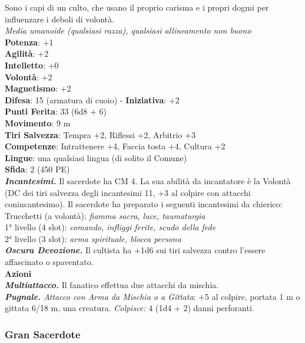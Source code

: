 \begin{multicols}{2}
Sono i capi di un culto, che usano il proprio carisma e i propri dogmi per influenzare i deboli di volontà.\\
\emph{Media umanoide (qualsiasi razza), qualsiasi allineamento non buono}\\
\textbf{Potenza}: +1\\
\textbf{Agilità}: +2\\
\textbf{Intelletto}: +0\\
\textbf{Volontà}: +2\\
\textbf{Magnetismo}: +2\\
\textbf{Difesa}: 15 (armatura di cuoio) - \textbf{Iniziativa}: +2\\
\textbf{Punti Ferita}: 33 (6d8 + 6)\\
\textbf{Movimento}: 9 m\\
\textbf{Tiri Salvezza}: Tempra +2, Riflessi +2, Arbitrio +3 \\
\textbf{Competenze}: Intrattenere +4, Faccia tosta +4, Cultura +2\\
\textbf{Lingue}: una qualsiasi lingua (di solito il Comune)\\
\textbf{Sfida}: 2 (450 PE)\smallskip\\
\emph{\textbf{Incantesimi.}} Il sacerdote ha CM 4. La sua abilità da incantatore è la Volontà (DC dei tiri salvezza degli incantesimi 11, +3 al colpire con attacchi conincantesimo). Il sacerdote ha preparato i seguenti incantesimi da chierico:\\
Trucchetti (a volontà): \emph{fiamma sacra, luce, taumaturgia} \\
1° livello (4 slot): \emph{comando, infliggi ferite, scudo della fede}\\
2° livello (3 slot): \emph{arma spirituale, blocca persona}\\
\emph{\textbf{Oscura Devozione.}} Il cultista ha +1d6 sui tiri salvezza contro l'essere affascinato o spaventato.\\
\smallskip\textbf{Azioni}\\
\emph{\textbf{Multiattacco.}} Il fanatico effettua due attacchi da mischia.\\
\emph{\textbf{Pugnale.} Attacco con Arma da Mischia o a Gittata}: +5 al colpire, portata 1 m o gittata 6/18 m, una creatura. \emph{Colpisce:} 4 (1d4 + 2) danni perforanti. \\

\subsubsection{Gran Sacerdote}


\end{multicols}
